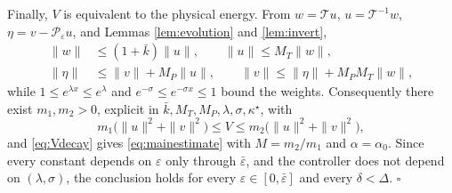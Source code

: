 \documentclass[12pt]{article}
\theoremstyle{plain}
\theoremstyle{remark}
\newcommand{\PP}{\mathcal P}
\newcommand{\TT}{\mathcal T}
\begin{document}
Finally, $V$ is equivalent to the physical energy. From $w=\TT u$, $u=\TT^{-1}w$, $\eta=v-\PP_\varepsilon u$, and Lemmas \ref{lem:evolution} and \ref{lem:invert},
\begin{align}
 \|w\|&\le(1+\bar k)\|u\|,\qquad
 \|u\|\le M_T\|w\|,
 \nonumber\\
 \|\eta\|&\le\|v\|+M_P\|u\|,\qquad
 \|v\|\le\|\eta\|+M_PM_T\|w\|,
 \label{eq:equiv1}
\end{align}
while $1\le e^{\lambda x}\le e^{\lambda}$ and $e^{-\sigma}\le e^{-\sigma x}\le1$ bound the weights. Consequently there exist $m_1,m_2>0$, explicit in $\bar k,M_T,M_P,\lambda,\sigma,\kappa^\star$, with
\begin{equation}
 m_1\big(\|u\|^2+\|v\|^2\big)\le V\le m_2\big(\|u\|^2+\|v\|^2\big),
 \label{eq:equiv2}
\end{equation}
and \eqref{eq:Vdecay} gives \eqref{eq:mainestimate} with $M=m_2/m_1$ and $\alpha=\alpha_0$. Since every constant depends on $\varepsilon$ only through $\bar\varepsilon$, and the controller does not depend on $(\lambda,\sigma)$, the conclusion holds for every $\varepsilon\in[0,\bar\varepsilon]$ and every $\delta<\Delta$. \hfill$\square$
\end{document}

